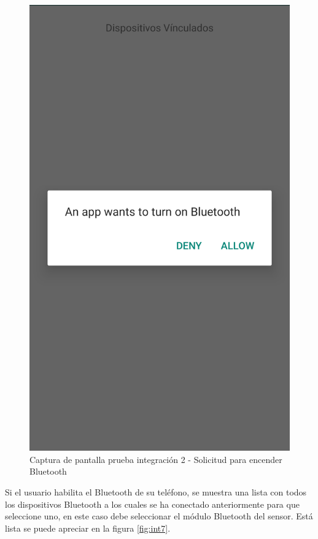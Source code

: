 \begin{figure}[H]
	\centering
	\includegraphics[scale=.2]{DocumentoTecnico/Capitulo6/integracion/Software/images/6.png}
	\caption{Captura de pantalla prueba integración 2 - Solicitud para encender Bluetooth}
	\label{fig:int6}
\end{figure}

Si el usuario habilita el Bluetooth de su teléfono, se muestra una lista con todos los dispositivos Bluetooth a los cuales se ha conectado anteriormente para que seleccione uno, en este caso debe seleccionar el módulo Bluetooth del sensor. Está lista se puede apreciar en la figura \ref{fig:int7}.

